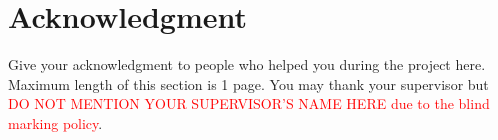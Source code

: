 \section*{Acknowledgment}
 {}
\vspace{-1em}
{\fontsize{12pt}{18pt}\selectfont 

Give your acknowledgment to people who helped you during the project here. Maximum length of this section is 1 page. You may thank your supervisor but \textcolor{red}{DO NOT MENTION YOUR SUPERVISOR’S NAME HERE due to the blind marking policy}.

}